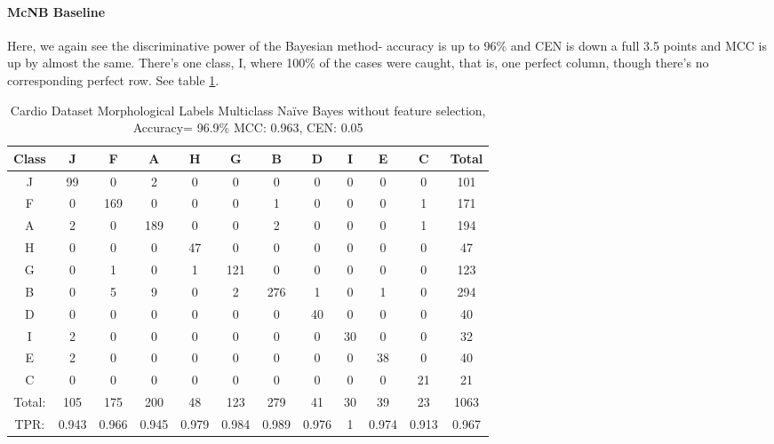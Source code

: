 \paragraph{McNB Baseline}
Here, we again see the discriminative power of the Bayesian method- accuracy is up to 96\% and CEN is down a full 3.5 points and MCC is up by almost the same.  There's one class, I, where 100\% of the cases were caught, that is, one perfect column, though there's no corresponding perfect row.  See table \ref{tab:cardiomorphmcnbbase}.
\begin{table}[h!]
	\centering
	\begin{tabular}{|c|c|c|c|c|c|c|c|c|c|c|c|}
\hline
Class&J&F&A&H&G&B&D&I&E&C&Total\\
\hline
J&99&0&2&0&0&0&0&0&0&0&101\\
F&0&169&0&0&0&1&0&0&0&1&171\\
A&2&0&189&0&0&2&0&0&0&1&194\\
H&0&0&0&47&0&0&0&0&0&0&47\\
G&0&1&0&1&121&0&0&0&0&0&123\\
B&0&5&9&0&2&276&1&0&1&0&294\\
D&0&0&0&0&0&0&40&0&0&0&40\\
I&2&0&0&0&0&0&0&30&0&0&32\\
E&2&0&0&0&0&0&0&0&38&0&40\\
C&0&0&0&0&0&0&0&0&0&21&21\\\hline
Total:&105&175&200&48&123&279&41&30&39&23&1063\\
TPR:&0.943&0.966&0.945&0.979&0.984&0.989&0.976&1&0.974&0.913&0.967\\
\hline
	\end{tabular}
	\caption[Cardiotocography Morphology:  Na\"ive Bayes without Feature Selection Confusion Matrix]{Cardio Dataset Morphological Labels Multiclass Na\"ive Bayes without feature selection, Accuracy= 96.9\% MCC: 0.963, CEN: 0.05}
	\label{tab:cardiomorphmcnbbase}
\end{table}
